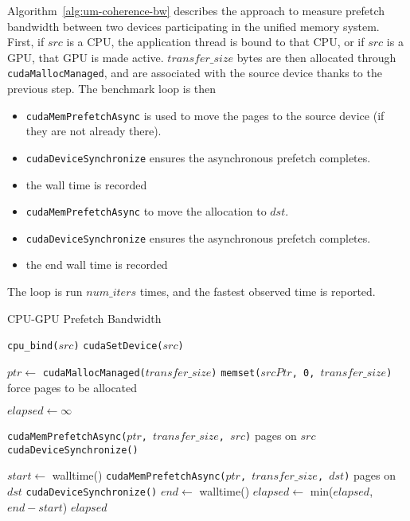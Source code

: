 Algorithm~\ref{alg:um-coherence-bw} describes the approach to measure prefetch bandwidth between two devices participating in the unified memory system.
First, if $src$ is a CPU, the application thread is bound to that CPU, or if $src$ is a GPU, that GPU is made active.
$transfer\_size$ bytes are then allocated through \texttt{cudaMallocManaged}, and are associated with the source device thanks to the previous step.
The benchmark loop is then
\begin{itemize}
    \item \texttt{cudaMemPrefetchAsync} is used to move the pages to the source device (if they are not already there).
    \item \texttt{cudaDeviceSynchronize} ensures the asynchronous prefetch completes.
    \item the wall time is recorded
    \item \texttt{cudaMemPrefetchAsync} to move the allocation to $dst$.
    \item \texttt{cudaDeviceSynchronize} ensures the asynchronous prefetch completes.
    \item the end wall time is recorded
\end{itemize}
The loop is run $num\_iters$ times, and the fastest observed time is reported.

\begin{algorithm}
    \caption{CPU-GPU Prefetch Bandwidth}
    \label{alg:um-prefetch-bw}
    \begin{algorithmic}[1]
    \Statex

            \State \texttt{cpu\_bind($src$)}
        \Else
            \State \texttt{cudaSetDevice($src$)}
        \EndIf

        \State $ptr \gets$ \texttt{cudaMallocManaged($transfer\_size$)}
        \State \texttt{memset($srcPtr$, 0, $transfer\_size$)} \Comment force pages to be allocated

        \State $elapsed \gets \infty$

            \State \texttt{cudaMemPrefetchAsync($ptr$, $transfer\_size$, $src$)} \Comment pages on $src$
            \State \texttt{cudaDeviceSynchronize()}

            \State $start \gets$ walltime()
            \State \texttt{cudaMemPrefetchAsync($ptr$, $transfer\_size$, $dst$)} \Comment pages on $dst$
            \State \texttt{cudaDeviceSynchronize()}
            \State $end \gets$ walltime()
            \State $elapsed \gets$ min($elapsed$, $end-start$)
        \EndFor
        \State \Return $elapsed$
    \EndFunction

    \end{algorithmic}
\end{algorithm}

